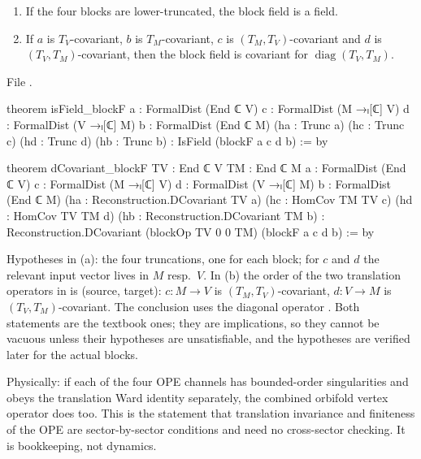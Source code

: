 \begin{proposition}\label{ch10:prop:blockfield}
\begin{enumerate}[label=(\alph*)]
\item If the four blocks are lower-truncated, the block field is a field.
\item If $a$ is $T_V$-covariant, $b$ is $T_M$-covariant, $c$ is $(T_M,T_V)$-covariant and $d$ is
  $(T_V,T_M)$-covariant, then the block field is covariant for $\operatorname{diag}(T_V,T_M)$.
\end{enumerate}
\end{proposition}
\noindent File .
\begin{leancode}
theorem isField_blockF {a : FormalDist (End ℂ V)} {c : FormalDist (M →ₗ[ℂ] V)}
    {d : FormalDist (V →ₗ[ℂ] M)} {b : FormalDist (End ℂ M)}
    (ha : Trunc a) (hc : Trunc c) (hd : Trunc d) (hb : Trunc b) :
    IsField (blockF a c d b) := by

theorem dCovariant_blockF {TV : End ℂ V} {TM : End ℂ M} {a : FormalDist (End ℂ V)}
    {c : FormalDist (M →ₗ[ℂ] V)} {d : FormalDist (V →ₗ[ℂ] M)} {b : FormalDist (End ℂ M)}
    (ha : Reconstruction.DCovariant TV a) (hc : HomCov TM TV c) (hd : HomCov TV TM d)
    (hb : Reconstruction.DCovariant TM b) :
    Reconstruction.DCovariant (blockOp TV 0 0 TM) (blockF a c d b) := by
\end{leancode}
\begin{dictionary}
Hypotheses in (a): the four truncations, one for each block; for $c$ and $d$ the relevant input
vector lives in $M$ resp.\ $V$.  In (b) the order of the two translation operators in
 is (source, target): $c:M\to V$ is $(T_M,T_V)$-covariant, $d:V\to M$ is
$(T_V,T_M)$-covariant.  The conclusion uses the diagonal operator .  Both
statements are the textbook ones; they are implications, so they cannot be vacuous unless their
hypotheses are unsatisfiable, and the hypotheses are verified later for the actual blocks.
\end{dictionary}

\begin{physics}
Physically: if each of the four OPE channels has bounded-order singularities and obeys the translation Ward identity separately, the combined orbifold vertex operator does too. This is the statement that translation invariance and finiteness of the OPE are sector-by-sector conditions and need no cross-sector checking. It is bookkeeping, not dynamics.
\end{physics}

